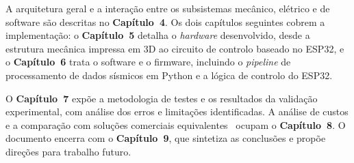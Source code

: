 A arquitetura geral e a interação entre os subsistemas mecânico, elétrico e de software são descritas no \textbf{Capítulo~4}. Os dois capítulos seguintes cobrem a implementação: o \textbf{Capítulo~5} detalha o \textit{hardware} desenvolvido, desde a estrutura mecânica impressa em 3D ao circuito de controlo baseado no ESP32, e o \textbf{Capítulo~6} trata o software e o firmware, incluindo o \textit{pipeline} de processamento de dados sísmicos em Python e a lógica de controlo do ESP32.

O \textbf{Capítulo~7} expõe a metodologia de testes e os resultados da validação experimental, com análise dos erros e limitações identificadas. A análise de custos e a comparação com soluções comerciais equivalentes~\cite{QuanserShakeTableIIXY} ocupam o \textbf{Capítulo~8}. O documento encerra com o \textbf{Capítulo~9}, que sintetiza as conclusões e propõe direções para trabalho futuro.
